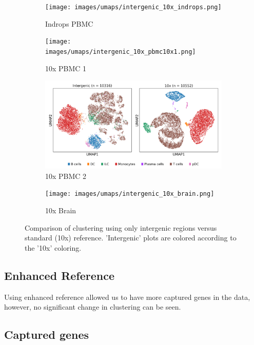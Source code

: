 \begin{figure}[htbp]
    \centering
    \begin{subfigure}{0.45\textwidth}
        \centering
        \texttt{[image: images/umaps/intergenic\_10x\_indrops.png]}
        \caption{Indrops PBMC}
    \end{subfigure}
    \hfill
    \begin{subfigure}{0.45\textwidth}
        \centering
        \texttt{[image: images/umaps/intergenic\_10x\_pbmc10x1.png]}
        \caption{10x PBMC 1}
    \end{subfigure}
    \vspace{0.5em}
    \begin{subfigure}{0.45\textwidth}
        \centering
        \includegraphics[width=\textwidth]{images/umaps/intergenic_10x_pbmc10x2.png}
        \caption{10x PBMC 2}
    \end{subfigure}
    \hfill
    \begin{subfigure}{0.45\textwidth}
        \centering
        \texttt{[image: images/umaps/intergenic\_10x\_brain.png]}
        \caption{10x Brain}
    \end{subfigure}
    \caption{Comparison of clustering using only intergenic regions versus standard (10x) reference.
    'Intergenic' plots are colored according to the '10x' coloring.}
    \label{fig:umapComparisonIntergenic}
\end{figure}

\subsection{Enhanced Reference}

Using enhanced reference allowed us to have more captured genes in the data,
however, no significant change in clustering can be seen.



\subsection{Captured genes}
